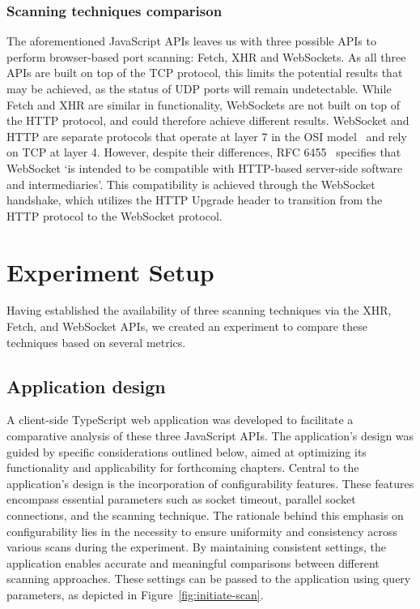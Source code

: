 \subsubsection{Scanning techniques comparison}

The aforementioned JavaScript APIs leaves us with three possible APIs to perform browser-based port scanning: Fetch, XHR and WebSockets. As all three APIs are built on top of the TCP protocol, this limits the potential results that may be achieved, as the status of UDP ports will remain undetectable. 
While Fetch and XHR are similar in functionality, WebSockets are not built on top of the HTTP protocol, and could therefore achieve different results. WebSocket and HTTP are separate protocols that operate at layer 7 in the OSI model~ and rely on TCP at layer 4. However, despite their differences, RFC 6455~ specifies that WebSocket `is intended to be compatible with HTTP-based server-side software and intermediaries'. This compatibility is achieved through the WebSocket handshake, which utilizes the HTTP Upgrade header to transition from the HTTP protocol to the WebSocket protocol.

\section{Experiment Setup}

Having established the availability of three scanning techniques via the XHR, Fetch, and WebSocket APIs, we created an experiment to compare these techniques based on several metrics.

\subsection{Application design}
\label{section:port-scanner-application}

A client-side TypeScript web application was developed to facilitate a comparative analysis of these three JavaScript APIs. The application's design was guided by specific considerations outlined below, aimed at optimizing its functionality and applicability for forthcoming chapters.
Central to the application's design is the incorporation of configurability features. These features encompass essential parameters such as socket timeout, parallel socket connections, and the scanning technique. The rationale behind this emphasis on configurability lies in the necessity to ensure uniformity and consistency across various scans during the experiment. By maintaining consistent settings, the application enables accurate and meaningful comparisons between different scanning approaches.
These settings can be passed to the application using query parameters, as depicted in Figure~\ref{fig:initiate-scan}. 

